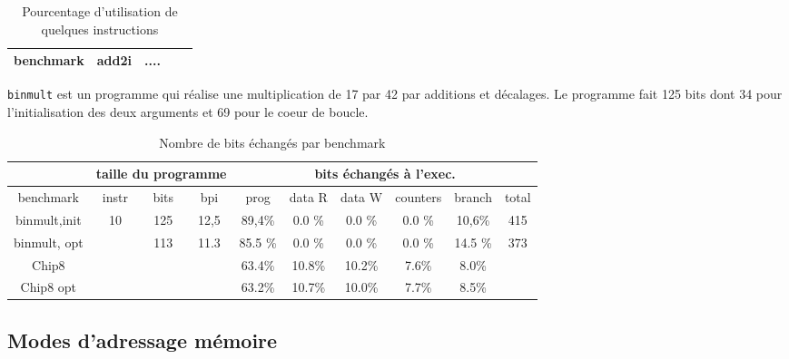 \documentclass[architecture]{compas2018}
\begin{document}
\begin{table}
  \centering
  \begin{tabular}{|c||c|c|c|c|}
    \hline
    benchmark & add2i & .... &  \\
    \hline
    \hline
  \end{tabular}
  \caption{Pourcentage d'utilisation de quelques instructions}
  \label{tab:opcounts}
\end{table}

\texttt{binmult} est un programme qui réalise une multiplication de 17 par 42 par additions et décalages.
Le programme fait 125 bits dont 34 pour l'initialisation des deux arguments et 69 pour le coeur de boucle.


\iffalse
./asm.py -v -b prog/mult.s
./emu/emu -s -t prog/mult.bin
./emu/emu -i prog/mult.bin | ./huffmann.py > mult.huff
./asm.py --loadhuffman mult.huff -v -b prog/mult.s -o  prog/mult.huff.bin
./emu/emu -s -t -lh mult.huff -i prog/mult.huff.bin

\fi

\begin{table}
  \centering
  \begin{tabular}{|c||c|c|c||c|c|c|c|c||c|}
    \hline
    & \multicolumn{3}{c||}{taille du programme} & \multicolumn{6}{c|}{bits échangés à l'exec.}                    \\
    \hline

    
    benchmark    & instr & bits & bpi  & prog    & data R & data W & counters & branch  & total \\
    \hline
    \hline
    binmult,init & 10    & 125  & 12,5 & 89,4\%  & 0.0 \% & 0.0 \% & 0.0 \%   & 10,6\%  & 415   \\
    binmult, opt &       & 113  & 11.3 & 85.5 \% & 0.0 \% & 0.0 \% & 0.0 \%   & 14.5 \% & 373   \\
        \hline
    Chip8        &       &      &      & 63.4\%  & 10.8\% & 10.2\% & 7.6\%    & 8.0\%   &       \\
    Chip8 opt    &       &      &      & 63.2\%  & 10.7\% & 10.0\% & 7.7\%    & 8.5\%   &       \\ 
    \hline
  \end{tabular}
  \caption{Nombre de bits échangés par benchmark}
  \label{tab:bitcounts}
\end{table}


\subsection{Modes d'adressage mémoire}
\end{document}
